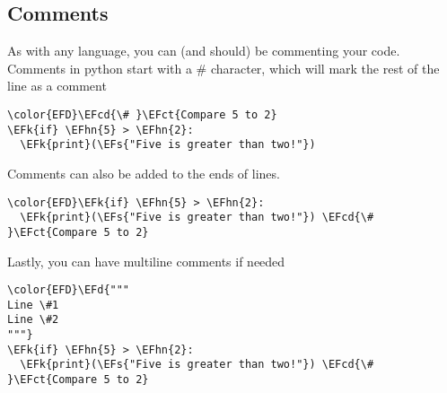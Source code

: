 \documentclass{scrartcl}
\newcommand{\EFk}[1]{\textcolor{EFk}{#1}} %
\newcommand{\EFd}[1]{\textcolor{EFd}{#1}} %
\newcommand{\EFs}[1]{\textcolor{EFs}{#1}} %
\newcommand{\EFct}[1]{\textcolor{EFct}{#1}} %
\newcommand{\EFcd}[1]{\textcolor{EFcd}{#1}} %
\newcommand{\EFhn}[1]{\textcolor{EFhn}{\textbf{#1}}} %
\begin{document}
\subsection{Comments}
\label{sec:org43308e7}
As with any language, you can (and should) be commenting your code. Comments in
python start with a \# character, which will mark the rest of the line as a comment
\begin{Code}
\begin{Verbatim}[]
\color{EFD}\EFcd{\# }\EFct{Compare 5 to 2}
\EFk{if} \EFhn{5} > \EFhn{2}:
  \EFk{print}(\EFs{"Five is greater than two!"})
\end{Verbatim}
\end{Code}
Comments can also be added to the ends of lines.
\begin{Code}
\begin{Verbatim}[]
\color{EFD}\EFk{if} \EFhn{5} > \EFhn{2}:
  \EFk{print}(\EFs{"Five is greater than two!"}) \EFcd{\# }\EFct{Compare 5 to 2}
\end{Verbatim}
\end{Code}
Lastly, you can have multiline comments if needed
\begin{Code}
\begin{Verbatim}[]
\color{EFD}\EFd{"""
Line \#1
Line \#2
"""}
\EFk{if} \EFhn{5} > \EFhn{2}:
  \EFk{print}(\EFs{"Five is greater than two!"}) \EFcd{\# }\EFct{Compare 5 to 2}
\end{Verbatim}
\end{Code}
\end{document}
